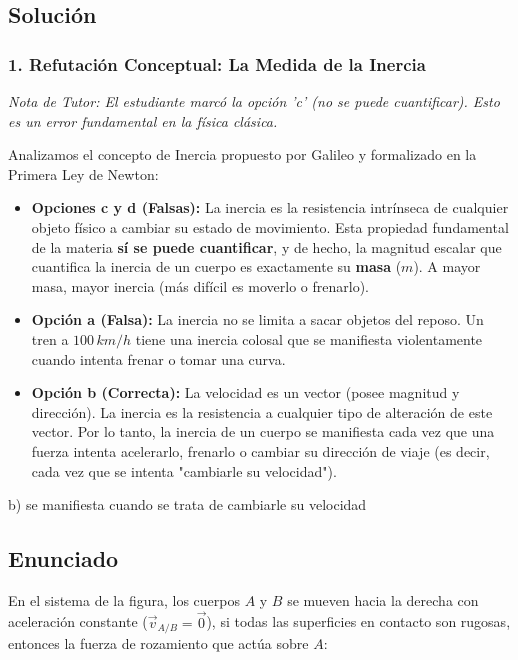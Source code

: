 \documentclass[12pt, a4paper]{article}
\begin{document}
\subsection*{Solución}

\subsubsection*{1. Refutación Conceptual: La Medida de la Inercia}
\textit{Nota de Tutor: El estudiante marcó la opción 'c' (no se puede cuantificar). Esto es un error fundamental en la física clásica.}

Analizamos el concepto de Inercia propuesto por Galileo y formalizado en la Primera Ley de Newton:
\begin{itemize}
    \item \textbf{Opciones c y d (Falsas):} La inercia es la resistencia intrínseca de cualquier objeto físico a cambiar su estado de movimiento. Esta propiedad fundamental de la materia \textbf{sí se puede cuantificar}, y de hecho, la magnitud escalar que cuantifica la inercia de un cuerpo es exactamente su \textbf{masa} ($m$). A mayor masa, mayor inercia (más difícil es moverlo o frenarlo).
    \item \textbf{Opción a (Falsa):} La inercia no se limita a sacar objetos del reposo. Un tren a $100\,\si{km/h}$ tiene una inercia colosal que se manifiesta violentamente cuando intenta frenar o tomar una curva.
    \item \textbf{Opción b (Correcta):} La velocidad es un vector (posee magnitud y dirección). La inercia es la resistencia a cualquier tipo de alteración de este vector. Por lo tanto, la inercia de un cuerpo se manifiesta cada vez que una fuerza intenta acelerarlo, frenarlo o cambiar su dirección de viaje (es decir, cada vez que se intenta "cambiarle su velocidad").
\end{itemize}

\begin{tcolorbox}[colback=green!5!white, colframe=green!50!black, title=Respuesta Final]
\centering \Large b) se manifiesta cuando se trata de cambiarle su velocidad
\end{tcolorbox}

\newpage

\subsection*{Enunciado}
En el sistema de la figura, los cuerpos $A$ y $B$ se mueven hacia la derecha con aceleración constante ($\vec{v}_{A/B} = \vec{0}$), si todas las superficies en contacto son rugosas, entonces la fuerza de rozamiento que actúa sobre $A$:
\end{document}
